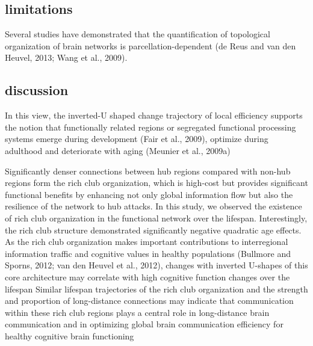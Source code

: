 \cite{Cao2014}


\subsection{limitations}
Several studies have demonstrated that the quantification of topological 
organization of brain networks is
parcellation-dependent (de Reus and van den Heuvel,
2013; Wang et al., 2009). 



\cite{Cao2014}


\subsection{discussion}

In this view, the inverted-U shaped change trajectory
of local efficiency supports the notion that functionally related 
regions or segregated functional processing
systems emerge during development (Fair et al., 2009),
optimize during adulthood and deteriorate with aging
(Meunier et al., 2009a)
\cite{Cao2014}


Significantly denser connections between hub regions compared
with non-hub regions form the rich club organization,
which is high-cost but provides significant functional benefits by 
enhancing not only global information flow but
also the resilience of the network to hub attacks. In this
study, we observed the existence of rich club organization
in the functional network over the lifespan. Interestingly,
the rich club structure demonstrated significantly negative
quadratic age effects. As the rich club organization makes
important contributions to interregional information traffic 
and cognitive values in healthy populations (Bullmore
and Sporns, 2012; van den Heuvel et al., 2012), changes
with inverted U-shapes of this core architecture may correlate 
with high cognitive function changes over the lifespan
Similar lifespan trajectories of the
rich club organization and the strength and proportion of
long-distance connections may indicate that communication within these 
rich club regions plays a central role
in long-distance brain communication and in optimizing
global brain communication efficiency for healthy cognitive brain 
functioning
\cite{Cao2014}




